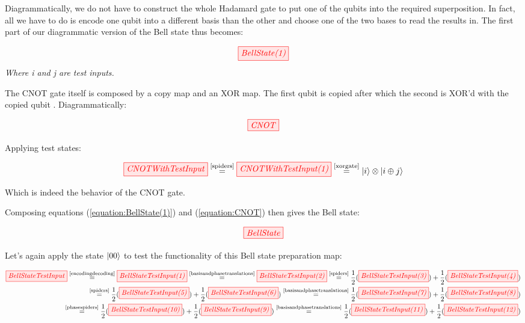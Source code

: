 \documentclass[]{article}
\newcommand{\equaltext}[1]{\ensuremath{\stackrel{\text{#1}}{=}}}
\begin{document}
Diagrammatically, we do not have to construct the whole Hadamard gate to put one of the qubits into the required superposition. In fact, all we have to do is encode one qubit into a different basis than the other and choose one of the two bases to read the results in. The first part of our diagrammatic version of the Bell state thus becomes:

\begin{equation}
	\label{equation:BellState(1)}
	\tikzfig{BellState(1)}
\end{equation}
\textit{Where i and j are test inputs.}

The CNOT gate itself is composed by a copy map and an XOR map. The first qubit is copied after which the second is XOR'd with the copied qubit \cite{articleCNOT}. Diagrammatically:

\begin{equation}
	\label{equation:CNOT}
	\tikzfig{CNOT}
\end{equation}

Applying test states:

\begin{equation}
	\tikzfig{CNOTWithTestInput} \equaltext{\ref{spiders}} \tikzfig{CNOTWithTestInput(1)} \equaltext{\ref{xorgate}} \ket{i} \otimes \ket{i \oplus j}
\end{equation}

Which is indeed the behavior of the CNOT gate.

Composing equations (\ref{equation:BellState(1)}) and (\ref{equation:CNOT}) then gives the Bell state:

\begin{equation}
	\tikzfig{BellState}
\end{equation}

Let's again apply the state $\ket{00}$ to test the functionality of this Bell state preparation map:

\begin{equation}
\label{BellStateTestInput}
	\begin{split}
	\tikzfig{BellStateTestInput} \equaltext{\ref{encodingdecoding}} \tikzfig{BellStateTestInput(1)} \equaltext{\ref{basisandphasetranslations}} \tikzfig{BellStateTestInput(2)} \equaltext{\ref{spiders}} \frac{1}{2}(\tikzfig{BellStateTestInput(3)}) + \frac{1}{2}(\tikzfig{BellStateTestInput(4)}) \\ \equaltext{\ref{spiders}} \frac{1}{2}(\tikzfig{BellStateTestInput(5)}) +
	\frac{1}{2}(\tikzfig{BellStateTestInput(6)}) 
	\equaltext{\ref{basisandphasetranslations}} \frac{1}{2}(\tikzfig{BellStateTestInput(7)}) + \frac{1}{2}(\tikzfig{BellStateTestInput(8)}) \\ \equaltext{\ref{phasespiders}}
	\frac{1}{2}(\tikzfig{BellStateTestInput(10)}) +
	 \frac{1}{2}(\tikzfig{BellStateTestInput(9)}) 
	 \equaltext{\ref{basisandphasetranslations}} \frac{1}{2}(\tikzfig{BellStateTestInput(11)}) +
	\frac{1}{2}(\tikzfig{BellStateTestInput(12)})
	\end{split}
\end{equation}
\end{document}
